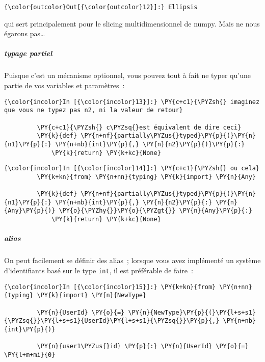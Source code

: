 \begin{Verbatim}[commandchars=\\\{\},frame=single,framerule=0.3mm,rulecolor=\color{cellframecolor}]
{\color{outcolor}Out[{\color{outcolor}12}]:} Ellipsis
\end{Verbatim}
            
    qui sert principalement pour le slicing multidimensionnel de numpy. Mais
ne nous égarons pas\ldots{}

    \hypertarget{typage-partiel}{%
\subparagraph{typage partiel}\label{typage-partiel}}

    Puisque c'est un mécanisme optionnel, vous pouvez tout à fait ne typer
qu'une partie de vos variables et paramètres~:

    \begin{Verbatim}[commandchars=\\\{\},frame=single,framerule=0.3mm,rulecolor=\color{cellframecolor}]
{\color{incolor}In [{\color{incolor}13}]:} \PY{c+c1}{\PYZsh{} imaginez que vous ne typez pas n2, ni la valeur de retour}
         
         \PY{c+c1}{\PYZsh{} c\PYZsq{}est équivalent de dire ceci}
         \PY{k}{def} \PY{n+nf}{partially\PYZus{}typed}\PY{p}{(}\PY{n}{n1}\PY{p}{:} \PY{n+nb}{int}\PY{p}{,} \PY{n}{n2}\PY{p}{)}\PY{p}{:}
             \PY{k}{return} \PY{k+kc}{None}
\end{Verbatim}


    \begin{Verbatim}[commandchars=\\\{\},frame=single,framerule=0.3mm,rulecolor=\color{cellframecolor}]
{\color{incolor}In [{\color{incolor}14}]:} \PY{c+c1}{\PYZsh{} ou cela}
         \PY{k+kn}{from} \PY{n+nn}{typing} \PY{k}{import} \PY{n}{Any}
         
         \PY{k}{def} \PY{n+nf}{partially\PYZus{}typed}\PY{p}{(}\PY{n}{n1}\PY{p}{:} \PY{n+nb}{int}\PY{p}{,} \PY{n}{n2}\PY{p}{:} \PY{n}{Any}\PY{p}{)} \PY{o}{\PYZhy{}}\PY{o}{\PYZgt{}} \PY{n}{Any}\PY{p}{:}
             \PY{k}{return} \PY{k+kc}{None}
\end{Verbatim}


    \hypertarget{alias}{%
\subparagraph{alias}\label{alias}}

    On peut facilement se définir des alias~; lorsque vous avez implémenté
un système d'identifiants basé sur le type \texttt{int}, il est
préférable de faire~:

    \begin{Verbatim}[commandchars=\\\{\},frame=single,framerule=0.3mm,rulecolor=\color{cellframecolor}]
{\color{incolor}In [{\color{incolor}15}]:} \PY{k+kn}{from} \PY{n+nn}{typing} \PY{k}{import} \PY{n}{NewType}
         
         \PY{n}{UserId} \PY{o}{=} \PY{n}{NewType}\PY{p}{(}\PY{l+s+s1}{\PYZsq{}}\PY{l+s+s1}{UserId}\PY{l+s+s1}{\PYZsq{}}\PY{p}{,} \PY{n+nb}{int}\PY{p}{)}
         
         \PY{n}{user1\PYZus{}id} \PY{p}{:} \PY{n}{UserId} \PY{o}{=} \PY{l+m+mi}{0}
\end{Verbatim}


